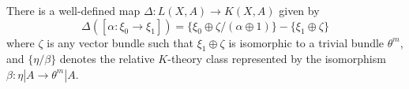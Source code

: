 There is a well-defined map $\Delta: L(X, A) \rightarrow K(X, A)$ given by
$$\Delta([\alpha: \xi_0 \rightarrow \xi_1]) = \{\xi_0 \oplus \zeta / (\alpha \oplus 1)\} - \{\xi_1 \oplus \zeta\}$$
where $\zeta$ is any vector bundle such that $\xi_1 \oplus \zeta$ is isomorphic to a trivial bundle $\theta^m$, and $\{\eta/\beta\}$ denotes the relative $K$-theory class represented by the isomorphism $\beta: \eta|A \to \theta^m|A$.